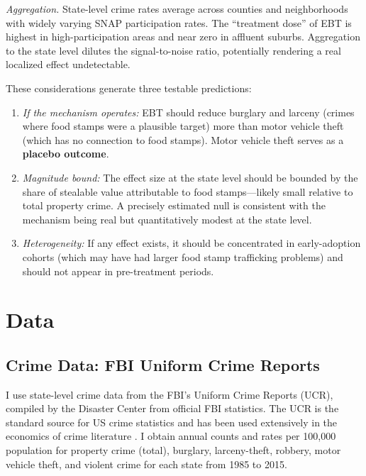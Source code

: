 \documentclass[12pt]{article}
\begin{document}
\textit{Aggregation.} State-level crime rates average across counties and neighborhoods with widely varying SNAP participation rates. The ``treatment dose'' of EBT is highest in high-participation areas and near zero in affluent suburbs. Aggregation to the state level dilutes the signal-to-noise ratio, potentially rendering a real localized effect undetectable.

These considerations generate three testable predictions:

\begin{enumerate}
\item \textit{If the mechanism operates:} EBT should reduce burglary and larceny (crimes where food stamps were a plausible target) more than motor vehicle theft (which has no connection to food stamps). Motor vehicle theft serves as a \textbf{placebo outcome}.

\item \textit{Magnitude bound:} The effect size at the state level should be bounded by the share of stealable value attributable to food stamps---likely small relative to total property crime. A precisely estimated null is consistent with the mechanism being real but quantitatively modest at the state level.

\item \textit{Heterogeneity:} If any effect exists, it should be concentrated in early-adoption cohorts (which may have had larger food stamp trafficking problems) and should not appear in pre-treatment periods.
\end{enumerate}


\section{Data} \label{sec:data}

\subsection{Crime Data: FBI Uniform Crime Reports}

I use state-level crime data from the FBI's Uniform Crime Reports (UCR), compiled by the Disaster Center from official FBI statistics. The UCR is the standard source for US crime statistics and has been used extensively in the economics of crime literature \citep{levitt1996effect, donohue2001impact, chalfin2022criminal}. I obtain annual counts and rates per 100,000 population for property crime (total), burglary, larceny-theft, robbery, motor vehicle theft, and violent crime for each state from 1985 to 2015.
\end{document}
